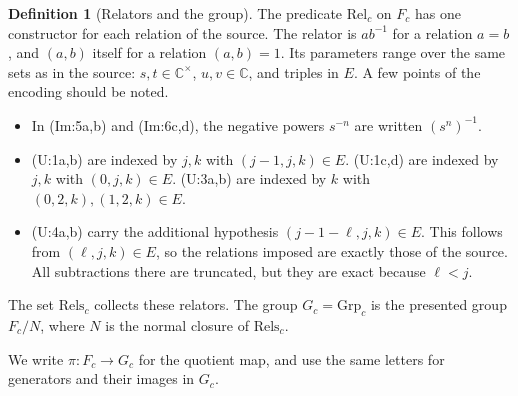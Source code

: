 \documentclass[11pt]{article}
\theoremstyle{definition}
\newtheorem{definition}[theorem]{Definition}
\theoremstyle{remark}
\newcommand{\Cx}{\mathbb{C}^{\times}}
\newcommand{\Gc}{G_c}
\begin{document}
\begin{definition}[Relators and the group]
The predicate $\mathrm{Rel}_c$ on $F_c$ has one constructor for each relation of the source. The relator is $ab^{-1}$ for a relation $a=b$, and $(a,b)$ itself for a relation $(a,b)=1$. Its parameters range over the same sets as in the source: $s,t\in\Cx$, $u,v\in\mathbb{C}$, and triples in $E$. A few points of the encoding should be noted.
\begin{itemize}
\item In (Im:5a,b) and (Im:6c,d), the negative powers $s^{-n}$ are written $(s^n)^{-1}$.
\item (U:1a,b) are indexed by $j,k$ with $(j-1,j,k)\in E$. (U:1c,d) are indexed by $j,k$ with $(0,j,k)\in E$. (U:3a,b) are indexed by $k$ with $(0,2,k),(1,2,k)\in E$.
\item (U:4a,b) carry the additional hypothesis $(j-1-\ell,j,k)\in E$. This follows from $(\ell,j,k)\in E$, so the relations imposed are exactly those of the source. All subtractions there are truncated, but they are exact because $\ell<j$.
\end{itemize}
The set $\mathrm{Rels}_c$ collects these relators. The group $\Gc=\mathrm{Grp}_c$ is the presented group $F_c/N$, where $N$ is the normal closure of $\mathrm{Rels}_c$.

We write $\pi\colon F_c\to\Gc$ for the quotient map, and use the same letters for generators and their images in $\Gc$.
\end{definition}
\end{document}
